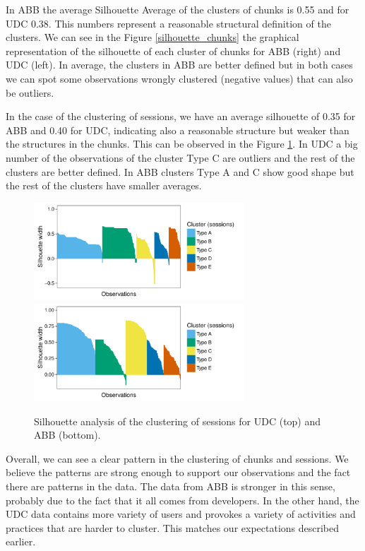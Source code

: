 In ABB the average Silhouette Average of the clusters of chunks is 0.55 and for UDC 0.38. This numbers represent a reasonable structural definition of the clusters. We can see in the Figure \ref{silhouette_chunks} the graphical representation of the silhouette of each cluster of chunks for ABB (right) and UDC (left). In average, the clusters in ABB are better defined but in both cases we can spot some observations wrongly clustered (negative values) that can also be outliers.

In the case of the clustering of sessions, we have an average silhouette of 0.35 for ABB and 0.40 for UDC, indicating also a reasonable structure but weaker than the structures in the chunks. This can be observed in the Figure \ref{silhouette_sessions}. In UDC a big number of the observations of the cluster Type C are outliers and the rest of the clusters are better defined. In ABB clusters Type A and C show good shape but the rest of the clusters have smaller averages.

\begin{figure}[!ht]
	\centering		
	\includegraphics[width=0.7\textwidth]{Figures/UDC_silhouette_sessions}
	\includegraphics[width=0.7\textwidth]{Figures/ABB_silhouette_sessions}	
	\caption{Silhouette analysis of the clustering of sessions for UDC (top) and ABB (bottom).}
	\label{silhouette_sessions}
\end{figure}

Overall, we can see a clear pattern in the clustering of chunks and sessions. We believe the patterns are strong enough to support our observations and the fact there are patterns in the data. The data from ABB is stronger in this sense, probably due to the fact that it all comes from developers. In the other hand, the UDC data contains more variety of users and provokes a variety of activities and practices that are harder to cluster. This matches our expectations described earlier.








